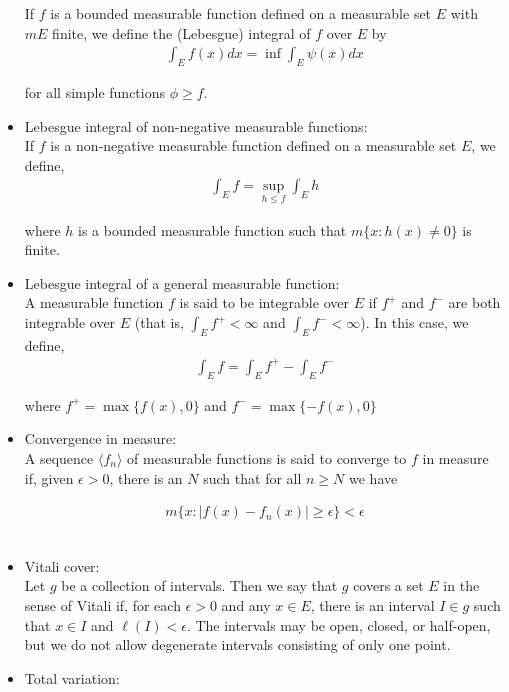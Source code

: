 \documentclass[12pt]{article}
\begin{document}
\begin{itemize}
If $f$ is a bounded measurable function defined on a measurable set $E$ with $mE$ finite, we define the (Lebesgue) integral of $f$ over $E$ by
\begin{align*}
\int_E f(x)dx = \inf \int_E \psi(x) dx
\end{align*}

for all simple functions $\phi \geq f$.
\\
\item Lebesgue integral of non-negative measurable functions:\\

If $f$ is a non-negative measurable function defined on a measurable set $E$, we define,
\begin{align*}
\int_E f = \sup_{h \leq f} \int_E h
\end{align*}

where $h$ is a bounded measurable function such that $m\{x: h(x) \neq 0\}$ is finite.
\\
\item Lebesgue integral of a general measurable function:\\

A measurable function $f$ is said to be integrable over $E$ if $f^+$ and $f^-$ are both integrable over $E$ (that is, $\int_E f^+ < \infty$ and $\int_E f^- < \infty$). In this case, we define,
\begin{align*}
\int_E f = \int_E f^+ - \int_E f^-
\end{align*}

where $f^+ = \max\{f(x), 0\}$ and $f^- = \max\{-f(x), 0\}$
\\
\item Convergence in measure:\\

A sequence $\langle f_n \rangle$ of measurable functions is said to converge to $f$ in measure if, given $\epsilon > 0$, there is an $N$ such that for all $n \geq N$ we have

\begin{align*}
m\{x: |f(x) - f_n(x)| \geq \epsilon\} < \epsilon
\end{align*}
\\
\item Vitali cover:\\

Let $g$ be a collection of intervals. Then we say that $g$ covers a set $E$ in the sense of Vitali if, for each $\epsilon > 0$ and any $x \in E$, there is an interval $I \in g$ such that $x \in I$ and $\ell(I) < \epsilon$. The intervals may be open, closed, or half-open, but we do not allow degenerate intervals consisting of only one point.
\\
\item Total variation:\\


\end{itemize}
\end{document}
